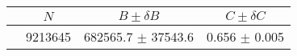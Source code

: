 \begin{tabular}{lccc}
\hline
    &   $N$   & $B \pm \delta B$  &  $C \pm \delta C$ \\
\hline
                               & 9213645    & 682565.7   $\pm$ 37543.6 & 0.656      $\pm$ 0.005 \\
\hline
\end{tabular}

